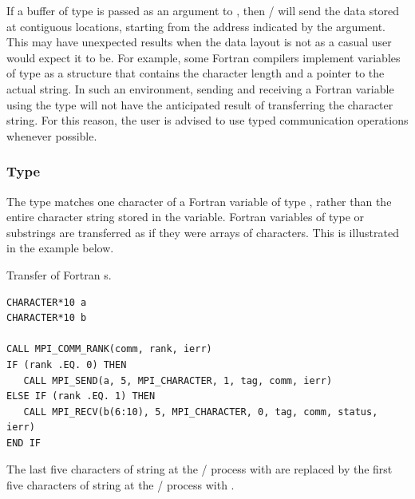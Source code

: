 \begin{users}
If a buffer of type  is passed as an argument to
, then \MPI/ will send the data stored at contiguous
locations, starting from the address
indicated by the  argument.  This may have unexpected results when
the data layout is not as a casual user would expect it to be.
For example, some Fortran compilers implement variables of type
as a structure that contains the character length and a pointer to
the actual string.  In such an environment, sending and receiving a Fortran
 variable using the  type will not
have the anticipated result of transferring the character string.
For this reason, the user is advised to use typed communication operations
whenever possible.
\end{users}

\subsubsection{Type \texorpdfstring{}{MPI\_CHARACTER}}

The
type  matches one character of a Fortran variable of
type , rather than the entire character string stored in the
variable.  Fortran variables of type 
or substrings are transferred as if they were arrays of characters.
This is illustrated in the example below.

\begin{example}
\label{pt2pt-exD}
%
Transfer of Fortran s.

\begin{lstlisting}[language={[MPI]Fortran}]
CHARACTER*10 a
CHARACTER*10 b

CALL MPI_COMM_RANK(comm, rank, ierr)
IF (rank .EQ. 0) THEN
   CALL MPI_SEND(a, 5, MPI_CHARACTER, 1, tag, comm, ierr)
ELSE IF (rank .EQ. 1) THEN
   CALL MPI_RECV(b(6:10), 5, MPI_CHARACTER, 0, tag, comm, status, ierr)
END IF
\end{lstlisting}

The last five characters of string  at the \MPI/ process with  are replaced by the
first five characters of string  at the \MPI/ process with .
\end{example}

